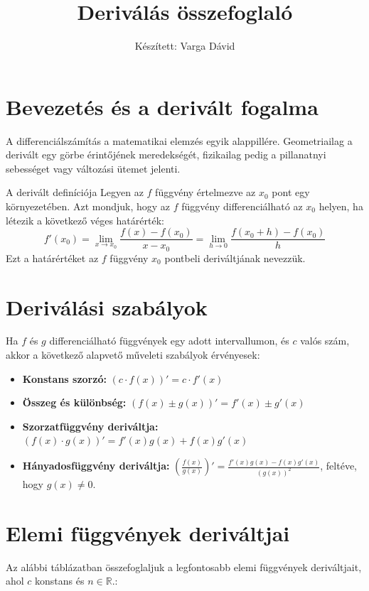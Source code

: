 \documentclass[11pt,a4paper]{article}
\title{Deriválás összefoglaló}
\author{Készített: Varga Dávid}
\date{}
\begin{document}
\maketitle

\section{Bevezetés és a derivált fogalma}
A differenciálszámítás a matematikai elemzés egyik alappillére. Geometriailag a derivált egy görbe érintőjének meredekségét, fizikailag pedig a pillanatnyi sebességet vagy változási ütemet jelenti.

\begin{defbox}{A derivált definíciója}
Legyen az $f$ függvény értelmezve az $x_0$ pont egy környezetében. Azt mondjuk, hogy az $f$ függvény differenciálható az $x_0$ helyen, ha létezik a következő véges határérték:
\[
f'(x_0) = \lim_{x \to x_0} \frac{f(x) - f(x_0)}{x - x_0} = \lim_{h \to 0} \frac{f(x_0 + h) - f(x_0)}{h}
\]
Ezt a határértéket az $f$ függvény $x_0$ pontbeli deriváltjának nevezzük.
\end{defbox}

\section{Deriválási szabályok}
Ha $f$ és $g$ differenciálható függvények egy adott intervallumon, és $c$ valós szám, akkor a következő alapvető műveleti szabályok érvényesek:

\begin{itemize}
    \item \textbf{Konstans szorzó:} $(c \cdot f(x))' = c \cdot f'(x)$
    \item \textbf{Összeg és különbség:} $(f(x) \pm g(x))' = f'(x) \pm g'(x)$
    \item \textbf{Szorzatfüggvény deriváltja:} $(f(x) \cdot g(x))' = f'(x)g(x) + f(x)g'(x)$
    \item \textbf{Hányadosfüggvény deriváltja:} $\left(\frac{f(x)}{g(x)}\right)' = \frac{f'(x)g(x) - f(x)g'(x)}{(g(x))^2}$, feltéve, hogy $g(x) \neq 0$.
\end{itemize}

\section{Elemi függvények deriváltjai}
Az alábbi táblázatban összefoglaljuk a legfontosabb elemi függvények deriváltjait, ahol $c$ konstans és $n \in \mathbb{R}$.:
\end{document}
